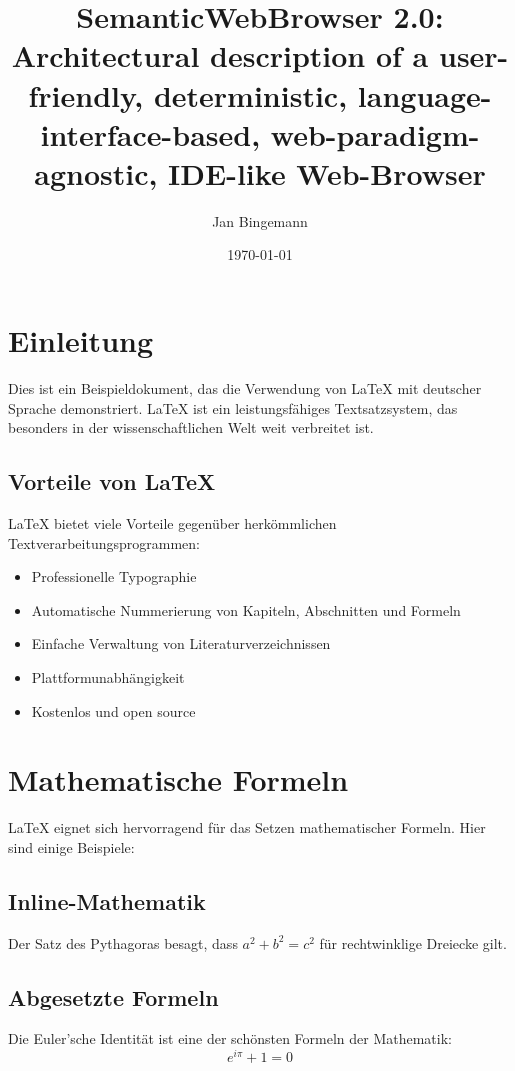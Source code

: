 \documentclass[12pt,a4paper]{article}
\title{SemanticWebBrowser 2.0:\\Architectural description of a user-friendly, deterministic, language-interface-based, web-paradigm-agnostic, IDE-like Web-Browser}
\author{Jan Bingemann}
\date{\today}
\begin{document}
\maketitle

\tableofcontents
\newpage

\section{Einleitung}

Dies ist ein Beispieldokument, das die Verwendung von LaTeX mit deutscher Sprache demonstriert. LaTeX ist ein leistungsfähiges Textsatzsystem, das besonders in der wissenschaftlichen Welt weit verbreitet ist.

\subsection{Vorteile von LaTeX}

LaTeX bietet viele Vorteile gegenüber herkömmlichen Textverarbeitungsprogrammen:

\begin{itemize}
    \item Professionelle Typographie
    \item Automatische Nummerierung von Kapiteln, Abschnitten und Formeln
    \item Einfache Verwaltung von Literaturverzeichnissen
    \item Plattformunabhängigkeit
    \item Kostenlos und open source
\end{itemize}

\section{Mathematische Formeln}

LaTeX eignet sich hervorragend für das Setzen mathematischer Formeln. Hier sind einige Beispiele:

\subsection{Inline-Mathematik}
Der Satz des Pythagoras besagt, dass $a^2 + b^2 = c^2$ für rechtwinklige Dreiecke gilt.

\subsection{Abgesetzte Formeln}
Die Euler'sche Identität ist eine der schönsten Formeln der Mathematik:
\begin{equation}
    e^{i\pi} + 1 = 0
\end{equation}
\end{document}
